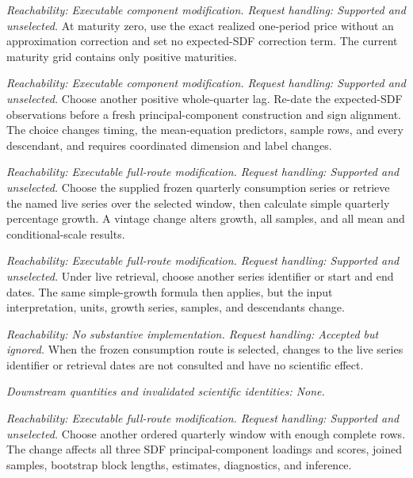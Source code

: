 \documentclass[11pt]{article}
\begin{document}
\begin{description}[style=nextline]
\item[Zero-maturity expected SDF.]
\emph{Reachability: Executable component modification. Request handling: Supported and unselected.}
At maturity zero, use the exact realized one-period price without an approximation correction and set
no expected-SDF correction term. The current maturity grid contains only positive maturities.

\item[Expected-SDF lag length.]
\emph{Reachability: Executable component modification. Request handling: Supported and unselected.}
Choose another positive whole-quarter lag. Re-date the expected-SDF observations before a fresh
principal-component construction and sign alignment. The choice changes timing, the mean-equation predictors,
sample rows, and every descendant, and requires coordinated dimension and label changes.

\item[Consumption vintage route.]
\emph{Reachability: Executable full-route modification. Request handling: Supported and unselected.}
Choose the supplied frozen quarterly consumption series or retrieve the named live series over the
selected window, then calculate simple quarterly percentage growth. A vintage change alters growth,
all samples, and all mean and conditional-scale results.

\item[Live consumption series and window.]
\emph{Reachability: Executable full-route modification. Request handling: Supported and unselected.}
Under live retrieval, choose another series identifier or start and end dates. The same simple-growth
formula then applies, but the input interpretation, units, growth series, samples, and descendants
change.

\item[Unused live-consumption settings.]
\emph{Reachability: No substantive implementation. Request handling: Accepted but ignored.}
When the frozen consumption route is selected, changes to the live series identifier or retrieval
dates are not consulted and have no scientific effect.

\emph{Downstream quantities and invalidated scientific identities: None.}

\item[PC window.]
\emph{Reachability: Executable full-route modification. Request handling: Supported and unselected.}
Choose another ordered quarterly window with enough complete rows. The change affects all three SDF
principal-component loadings and scores, joined samples, bootstrap block lengths, estimates,
diagnostics, and inference.


\end{description}
\end{document}

